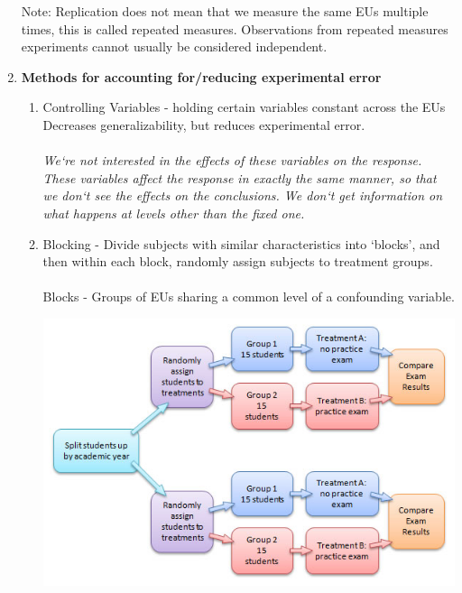 \begin{enumerate}
\begin{enumerate}
			\end{enumerate}
Note: Replication does not mean that we measure the same EUs multiple times, this is called repeated measures.  Observations from repeated measures experiments cannot 	usually be considered independent.
\newpage
		\item \textbf{Methods for accounting for/reducing experimental error}
		\begin{enumerate}
			\item Controlling Variables - holding certain variables constant across the EUs\\
			Decreases generalizability, but reduces experimental error.\\~\\
\noindent\textit{We`re not interested in the effects of these variables on the response.  These variables affect the response in exactly the same manner, so that we	don`t see the effects on the conclusions. We don`t get information on what happens at levels other than the fixed one.}
		\item Blocking - Divide subjects with similar characteristics into `blocks', and then within each block, randomly assign subjects to treatment groups.\\~\\
			Blocks - Groups of EUs sharing a common level of a confounding variable.\\
\begin{center}
\includegraphics[scale=0.5]{block.jpg}

\end{center}
\end{enumerate}
\end{enumerate}
